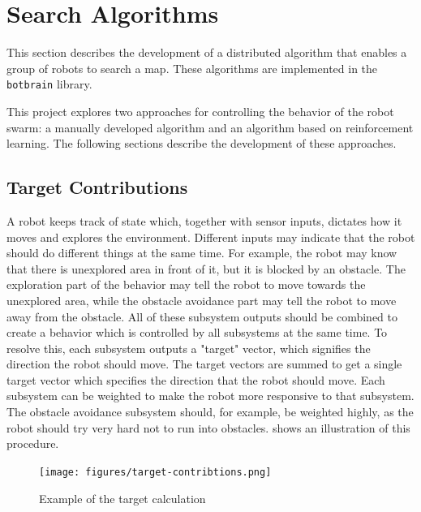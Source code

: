 
\section{Search Algorithms}
This section describes the development of a distributed algorithm that enables a group of robots to search a map. These algorithms are implemented in the \texttt{botbrain} library.

This project explores two approaches for controlling the behavior of the robot swarm: a manually developed algorithm and an algorithm based on reinforcement learning. The following sections describe the development of these approaches.

\subsection{Target Contributions}
A robot keeps track of state which, together with sensor inputs, dictates how it moves and explores the environment. Different inputs may indicate that the robot should do different things at the same time. For example, the robot may {\color{red} know} that there is unexplored area in front of it, but it is blocked by an obstacle. The exploration part of the behavior may tell the robot to move towards the unexplored area, while the obstacle avoidance part may {\color{red} tell} the robot to move away from the obstacle. All of these subsystem outputs should be combined to create a behavior which is controlled by all subsystems at the same time. To resolve this, each subsystem outputs a "target" vector, which signifies the direction the robot should move. The target vectors are summed to get a single target vector which specifies the direction that the robot should move. Each subsystem can be weighted to make the robot more responsive to that subsystem. The obstacle avoidance subsystem should, for example, be weighted highly, as the robot should {\color{red} try} very hard not to run into obstacles.  shows an illustration of this procedure.
\begin{figure}[H]
    \begin{center}
        \texttt{[image: figures/target-contribtions.png]}
    \end{center}
    \caption{Example of the target calculation}
    \label{fig:target-contributions}
\end{figure}



